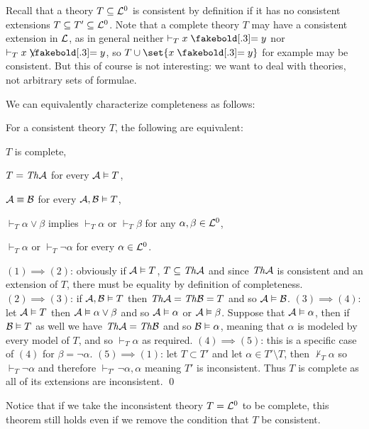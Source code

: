 Recall that a theory $T\subseteq{\cal L}^0$ is consistent by definition if it has no consistent extensions $T\subseteq T'\subseteq{\cal L}^0$.
Note that a complete theory $T$ may have a consistent extension in ${\cal L}$, as in general neither $\vdash_T x\eq y$ nor $\vdash_T x\neqb y$, so $T\cup\set{x\eq y}$ for example may be consistent.
But this of course is not interesting: we want to deal with theories, not arbitrary sets of formulae.

We can equivalently characterize completeness as follows:

\bthrm

    For a consistent theory $T$, the following are equivalent:
    \benum
        \item $T$ is complete,
        \item $T={\it Th}{\cal A}$ for every ${\cal A}\vDash T$,
        \item ${\cal A}\equiv{\cal B}$ for every ${\cal A},{\cal B}\vDash T$,
        \item $\vdash_T\alpha\lor\beta$ implies $\vdash_T\alpha$ or $\vdash_T\beta$ for any $\alpha,\beta\in{\cal L}^0$,
        \item $\vdash_T\alpha$ or $\vdash_T\neg\alpha$ for every $\alpha\in{\cal L}^0$.
    \eenum

\ethrm

$(1)\implies(2)$: obviously if ${\cal A}\vDash T$, $T\subseteq{\it Th}{\cal A}$ and since ${\it Th}{\cal A}$ is consistent and an extension of $T$, there must be equality by definition of completeness.
$(2)\implies(3)$: if ${\cal A},{\cal B}\vDash T$ then ${\it Th}{\cal A}={\it Th}{\cal B}=T$ and so ${\cal A}\vDash{\cal B}$.
$(3)\implies(4)$: let ${\cal A}\vDash T$ then ${\cal A}\vDash\alpha\lor\beta$ and so ${\cal A}\vDash\alpha$ or ${\cal A}\vDash\beta$.
Suppose that ${\cal A}\vDash\alpha$, then if ${\cal B}\vDash T$ as well we have ${\it Th}{\cal A}={\it Th}{\cal B}$ and so ${\cal B}\vDash\alpha$, meaning that $\alpha$ is modeled by every model of $T$, and so
$\vdash_T\alpha$ as required.
$(4)\implies(5)$: this is a specific case of $(4)$ for $\beta=\neg\alpha$.
$(5)\implies(1)$: let $T\subset T'$ and let $\alpha\in T'\setminus T$, then $\nvdash_T\alpha$ so $\vdash_T\neg\alpha$ and therefore $\vdash_{T'}\neg\alpha,\alpha$ meaning $T'$ is inconsistent.
Thus $T$ is complete as all of its extensions are inconsistent.
\qed

Notice that if we take the inconsistent theory $T={\cal L}^0$ to be complete, this theorem still holds even if we remove the condition that $T$ be consistent.

